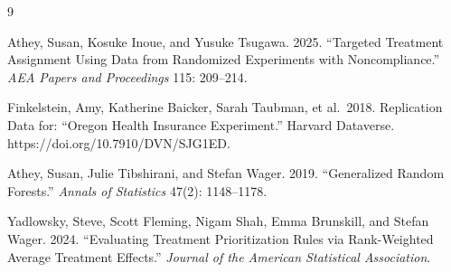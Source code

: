 \documentclass[12pt]{article}
\begin{document}
\begin{thebibliography}{9}

Athey, Susan, Kosuke Inoue, and Yusuke Tsugawa. 2025.
``Targeted Treatment Assignment Using Data from Randomized Experiments
with Noncompliance.''
\textit{AEA Papers and Proceedings} 115: 209--214.

Finkelstein, Amy, Katherine Baicker, Sarah Taubman, et al.\ 2018.
Replication Data for: ``Oregon Health Insurance Experiment.''
Harvard Dataverse. https://doi.org/10.7910/DVN/SJG1ED.

Athey, Susan, Julie Tibshirani, and Stefan Wager. 2019.
``Generalized Random Forests.''
\textit{Annals of Statistics} 47(2): 1148--1178.

Yadlowsky, Steve, Scott Fleming, Nigam Shah, Emma Brunskill, and Stefan Wager.
2024. ``Evaluating Treatment Prioritization Rules via Rank-Weighted Average
Treatment Effects.'' \textit{Journal of the American Statistical Association}.

\end{thebibliography}
\end{document}
